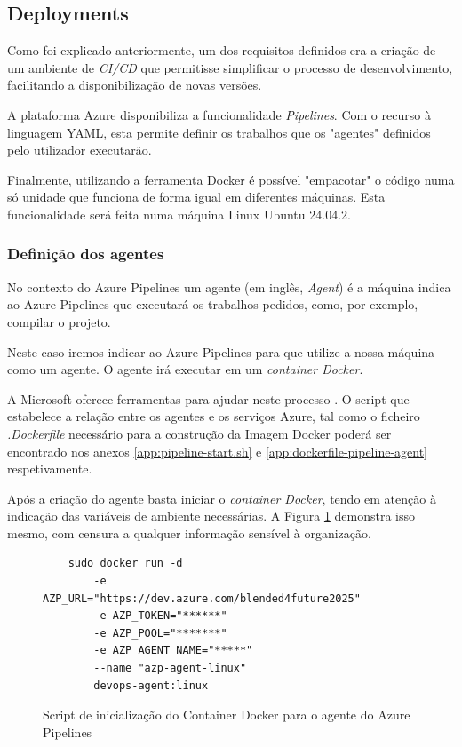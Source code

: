 \subsection{Deployments}

Como foi explicado anteriormente, um dos requisitos definidos  era a criação de um ambiente de \textit{CI/CD} que permitisse simplificar o processo de desenvolvimento, facilitando a disponibilização de novas versões.

A plataforma Azure disponibiliza a funcionalidade \textit{Pipelines}. Com o recurso à linguagem YAML, esta permite definir os trabalhos que os "agentes" definidos pelo utilizador executarão.

Finalmente, utilizando a ferramenta Docker é possível "empacotar" o código numa só unidade que funciona de forma igual em diferentes máquinas. Esta funcionalidade será feita numa máquina Linux Ubuntu 24.04.2. 

\subsubsection{Definição dos agentes}

No contexto do Azure Pipelines um agente (em inglês, \textit{Agent}) é a máquina indica ao Azure Pipelines que executará os trabalhos pedidos, como, por exemplo, compilar o projeto. 

Neste caso iremos indicar ao Azure Pipelines para que utilize a nossa máquina como um agente. O agente irá executar em um \textit{container Docker}.

A Microsoft oferece ferramentas para ajudar neste processo \cite{run-a-self-hosted-agent-in-docker}. O script que estabelece a relação entre os agentes e os serviços Azure, tal como o ficheiro \textit{.Dockerfile} necessário para a construção da Imagem Docker poderá ser encontrado nos anexos \ref{app:pipeline-start.sh} e \ref{app:dockerfile-pipeline-agent} respetivamente.

Após a criação do agente basta iniciar o \textit{container Docker}, tendo em atenção à indicação das variáveis de ambiente necessárias. A Figura \ref{fig:start-docker-agent} demonstra isso mesmo, com censura a qualquer informação sensível à organização.

\begin{figure}[h!tbp]
    

\begin{lstlisting}
    sudo docker run -d 
        -e AZP_URL="https://dev.azure.com/blended4future2025" 
        -e AZP_TOKEN="******" 
        -e AZP_POOL="*******" 
        -e AZP_AGENT_NAME="*****" 
        --name "azp-agent-linux" 
        devops-agent:linux
\end{lstlisting}


\caption{Script de inicialização do Container Docker para o agente do Azure Pipelines}
\label{fig:start-docker-agent}

\end{figure}

